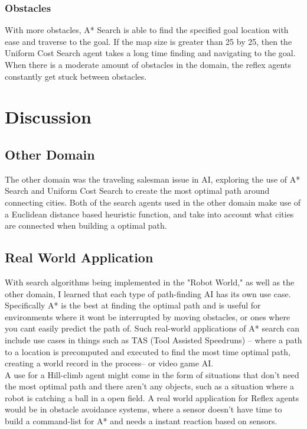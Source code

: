 \documentclass[11pt]{article}
\begin{document}
\subsubsection{Obstacles}
\label{sec:orga0ed532}
With more obstacles, A* Search is able to find the specified goal
location with ease and traverse to the goal. If the map size is greater than
25 by 25, then the  Uniform Cost Search agent takes a long time finding and
navigating to the goal. When there is a moderate amount of
obstacles in the domain, the reflex agents constantly get stuck between obstacles. 
\section{Discussion}
\label{sec:org64db69e}
\subsection{Other Domain}
\label{sec:orgcae5942}
The other domain was the traveling salesman issue in AI, exploring the use of A* Search and
Uniform Cost Search to create the most optimal path around connecting cities. Both of the search
agents used in the other domain make use of a Euclidean distance based heuristic function, and
take into account what cities are connected when building a optimal path. 
\subsection{Real World Application}
\label{sec:org4c570c0}
With search algorithms being implemented in the "Robot World," as
well as the other domain, I learned that each type of path-finding AI has its own
use case. Specifically A* is the best at finding the optimal path and is useful for
environments where it wont be interrupted by moving obstacles, or ones where you cant
easily predict the path of. Such real-world applications
of A* search can include use cases in things such as TAS (Tool Assisted Speedruns)
-- where a path to a location is precomputed and executed to find the most time optimal path,
creating a world record in the process-- or
video game AI. \\
A use for a Hill-climb agent might come in the form of situations that don't need the most optimal
path and there aren't any objects, such as a situation where a robot is catching a ball in a open field.
A real world application for Reflex agents would be in obstacle avoidance systems, where a sensor doesn't
have time to build a command-list for A* and needs a instant reaction based on sensors. 
\end{document}
